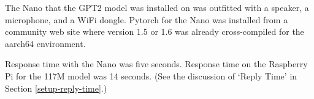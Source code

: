 
The Nano that the GPT2 model was installed on was outfitted with a speaker, a microphone, and a WiFi dongle. Pytorch for the Nano was installed from a community web site where version 1.5 or 1.6 was already cross-compiled for the aarch64 environment. 

Response time with the Nano was five seconds. Response time on the Raspberry Pi for the 117M model was 14 seconds. (See the discussion of `Reply Time' in Section \ref{setup-reply-time}.)
